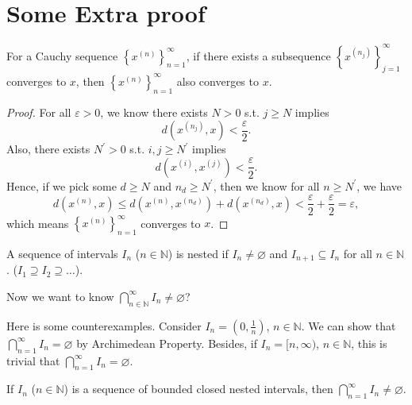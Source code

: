 \chapter{Some Extra proof}
\begin{theorem} \label{thm: if subseq of cauchy converge, then cauchy converge to same point}
    For a Cauchy sequence \(\left\{ x^{(n)} \right\}_{n=1}^{\infty}  \), if there exists a subsequence \(\left\{ x^{(n_j)} \right\}_{j=1}^{\infty}  \) converges to \(x\), then \(\left\{ x^{(n)} \right\}_{n=1}^{\infty}  \) also converges to \(x\).   
\end{theorem}
\begin{proof}
    For all \(\varepsilon > 0\), we know there exists \(N > 0\) s.t. \(j \ge N\) implies 
    \[
        d\left( x^{(n_j)}, x \right) < \frac{\varepsilon}{2}. 
    \]  
    Also, there exists \(N^{\prime} > 0\) s.t. \(i, j \ge N^{\prime} \) implies
    \[
        d\left( x^{(i)}, x^{(j)} \right) < \frac{\varepsilon}{2}. 
    \]  
    Hence, if we pick some \(d \ge N\) and \(n_d \ge N^{\prime} \), then we know for all \(n \ge N^{\prime} \), we have 
    \[
        d \left( x^{(n)}, x \right) \le d \left( x^{(n)}, x^{(n_d)} \right) + d \left( x^{(n_d)}, x \right) < \frac{\varepsilon}{2} + \frac{\varepsilon}{2} = \varepsilon,
    \] which means \(\left\{ x^{(n)} \right\}_{n=1}^{\infty}  \) converges to \(x\).  
\end{proof}


\begin{definition}
    A sequence of intervals \(I_n\) (\(n \in \mathbb{N} \)) is nested if \(I_n \neq \varnothing \) and \(I_{n+1} \subseteq I_n\) for all \(n \in \mathbb{N}\). (\(I_1 \supseteq I_2 \supseteq \dots\)).     
\end{definition}

Now we want to know \(\bigcap_{n \in \mathbb{N} }^{\infty} I_n \neq \varnothing \)?

Here is some counterexamples. Consider \(I_n = (0, \frac{1}{n})\), \(n \in \mathbb{N} \). We can show that \(\bigcap_{n=1}^{\infty} I_n = \varnothing  \) by Archimedean Property. Besides, if \(I_n = [n, \infty )\), \(n \in \mathbb{N} \), this is trivial that \(\bigcap_{n=1}^{\infty} I_n = \varnothing  \). 

\begin{theorem}\label{thm: nested interval}
    If \(I_n\) (\(n \in \mathbb{N} \)) is a sequence of bounded closed nested intervals, then \(\bigcap_{n=1}^{\infty} I_n \neq \varnothing  \).  
\end{theorem}

